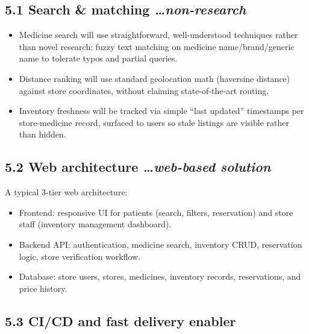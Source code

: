 \documentclass[
]{article}
\begin{document}
\subsection{\texorpdfstring{\textbf{5.1 Search \& matching}
\emph{\ldots non-research}}{5.1 Search \& matching \ldots non-research}}\label{search-matching-non-research}

\begin{itemize}
\item
  Medicine search will use straightforward, well-understood techniques
  rather than novel research: fuzzy text matching on medicine
  name/brand/generic name to tolerate typos and partial queries.
\item
  Distance ranking will use standard geolocation math (haversine
  distance) against store coordinates, without claiming state-of-the-art
  routing.
\item
  Inventory freshness will be tracked via simple ``last updated''
  timestamps per store-medicine record, surfaced to users so stale
  listings are visible rather than hidden.
\end{itemize}

\subsection{\texorpdfstring{\textbf{5.2 Web architecture}
\emph{\ldots web-based
solution}}{5.2 Web architecture \ldots web-based solution}}\label{web-architecture-web-based-solution}

A typical 3-tier web architecture:

\begin{itemize}
\item
  Frontend: responsive UI for patients (search, filters, reservation)
  and store staff (inventory management dashboard).
\item
  Backend API: authentication, medicine search, inventory CRUD,
  reservation logic, store verification workflow.
\item
  Database: store users, stores, medicines, inventory records,
  reservations, and price history.
\end{itemize}

\subsection{\texorpdfstring{\textbf{5.3 CI/CD and fast delivery
enabler}}{5.3 CI/CD and fast delivery enabler}}\label{cicd-and-fast-delivery-enabler}
\end{document}
